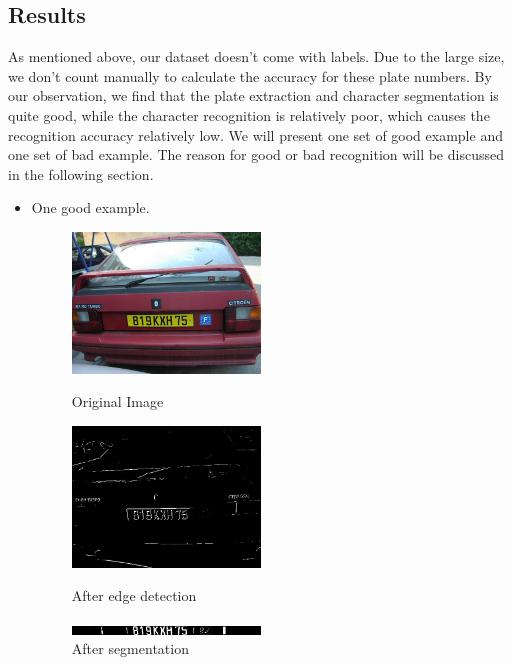 \documentclass{article}
\begin{document}
\begin{spacing}{1.0}
\section{Results}
As mentioned above, our dataset doesn't come with labels. Due to the large size, we don't count manually to calculate the accuracy for these plate numbers. By our observation, we find that the plate extraction and character segmentation is quite good, while the character recognition is relatively poor, which causes the recognition accuracy relatively low. We will present one set of good example and one set of bad example. The reason for good or bad recognition will be discussed in the following section.

\begin{itemize}
	\item One good example.
	\begin{figure}[H]
		\centering
		\begin{minipage}{5cm}
			\includegraphics[width=5cm]{P1010003.jpg}
			\caption{Original Image}
		\end{minipage}
		\begin{minipage}{5cm}
			\includegraphics[width=5cm]{P1010003_edge.jpg}
			\caption{After edge detection}
		\end{minipage}
		\begin{minipage}{5cm}
			\includegraphics[width=5cm]{P1010003_extract.jpg}
			\caption{After segmentation}
		\end{minipage}
	\end{figure}


\end{itemize}
\end{spacing}
\end{document}

